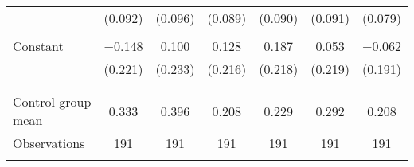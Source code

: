 \begin{tabular}{@{\extracolsep{5pt}}lcccccc}
  & (0.092) & (0.096) & (0.089) & (0.090) & (0.091) & (0.079) \\ 
  & & & & & & \\ 
 Constant & $-$0.148 & 0.100 & 0.128 & 0.187 & 0.053 & $-$0.062 \\ 
  & (0.221) & (0.233) & (0.216) & (0.218) & (0.219) & (0.191) \\ 
  & & & & & & \\ 
\hline \\[-1.8ex] 
Control group mean & 0.333 & 0.396 & 0.208 & 0.229 & 0.292 & 0.208 \\ 
Observations & 191 & 191 & 191 & 191 & 191 & 191 \\ 
\hline 
\hline \\[-1.8ex] 
\end{tabular} 
